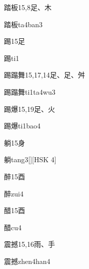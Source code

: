 \begin{entry}{踏板}{15,8}{⾜、⽊}
  \begin{phonetics}{踏板}{ta4ban3}
  \end{phonetics}
\end{entry}

\begin{entry}{踢}{15}{⾜}
  \begin{phonetics}{踢}{ti1}
  \end{phonetics}
\end{entry}

\begin{entry}{踢蹋舞}{15,17,14}{⾜、⾜、⾇}
  \begin{phonetics}{踢蹋舞}{ti1ta4wu3}
  \end{phonetics}
\end{entry}

\begin{entry}{踢爆}{15,19}{⾜、⽕}
  \begin{phonetics}{踢爆}{ti1bao4}
  \end{phonetics}
\end{entry}

\begin{entry}{躺}{15}{⾝}
  \begin{phonetics}{躺}{tang3}[][HSK 4]
  \end{phonetics}
\end{entry}

\begin{entry}{醉}{15}{⾣}
  \begin{phonetics}{醉}{zui4}
  \end{phonetics}
\end{entry}

\begin{entry}{醋}{15}{⾣}
  \begin{phonetics}{醋}{cu4}
  \end{phonetics}
\end{entry}

\begin{entry}{震撼}{15,16}{⾬、⼿}
  \begin{phonetics}{震撼}{zhen4han4}
  \end{phonetics}
\end{entry}

